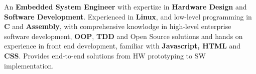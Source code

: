 \nohyphens{\justify
An \textbf{Embedded System Engineer} with expertize in \textbf{Hardware Design} and \textbf{Software Development}. Experienced in \textbf{Linux},
and low-level programming in \textbf{C} and \textbf{Assembly}, with comprehensive knowlodge in high-level
enterprise software development, \textbf{OOP}, \textbf{TDD} and Open Source solutions and hands on experience in front end development,
familiar with \textbf{Javascript, HTML} and \textbf{CSS}. Provides end-to-end solutions from HW prototyping to SW implementation.
}
